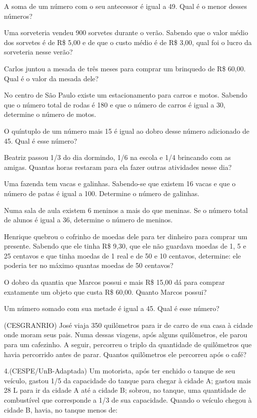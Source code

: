 				\item A soma de um número com o seu antecessor é igual a 49. Qual é o menor desses números?
				\item Uma sorveteria vendeu 900 sorvetes durante o verão. Sabendo que o valor médio dos sorvetes é de R\$ 5,00 e de que o custo médio é de R\$ 3,00, qual foi o lucro da sorveteria nesse verão?
				\item Carlos juntou a mesada de três meses para comprar um brinquedo de R\$ 60,00. Qual é o valor da mesada dele?
				\item No centro de São Paulo existe um estacionamento para carros e motos. Sabendo que o número total de rodas é 180 e que o número de carros é igual a 30, determine o número de motos.
				\item O quíntuplo de um número mais 15 é igual ao dobro desse número adicionado de 45. Qual é esse número?
				\item Beatriz passou 1/3 do dia dormindo, 1/6 na escola e 1/4 brincando com as amigas. Quantas horas restaram para ela fazer outras atividades nesse dia?
				\item Uma fazenda tem vacas e galinhas. Sabendo-se que existem 16 vacas e que o número de patas é igual a 100. Determine o número de galinhas.
				\item Numa sala de aula existem 6 meninos a mais do que meninas. Se o número total de alunos é igual a 36, determine o número de meninos.
				\item Henrique quebrou o cofrinho de moedas dele para ter dinheiro para comprar um presente. Sabendo que ele tinha R\$ 9,30, que ele não guardava moedas de 1, 5 e 25 centavos e que tinha moedas de 1 real e de 50 e 10 centavos, determine: ele poderia ter no máximo quantas moedas de 50 centavos?
				\item O dobro da quantia que Marcos possui e mais R\$ 15,00 dá para comprar exatamente um objeto que custa R\$ 60,00. Quanto Marcos possui?
				\item Um número somado com sua metade é igual a 45. Qual é esse número?
				\item (CESGRANRIO) José viaja 350 quilômetros para ir de carro de sua casa à cidade onde moram seus pais. Numa dessas viagens, após alguns quilômetros, ele parou para um cafezinho. A seguir, percorreu o triplo da quantidade de quilômetros que havia percorrido antes de parar. Quantos quilômetros ele percorreu após o café?
				\item 4.(CESPE/UnB-Adaptada) Um motorista, após ter enchido o tanque de seu veículo, gastou 1/5 da capacidade do tanque para chegar à cidade A; gastou mais 28 L para ir da cidade A até a cidade B; sobrou, no tanque, uma quantidade de combustível que corresponde a 1/3 de sua capacidade. Quando o veículo chegou à cidade B, havia, no tanque menos de:
